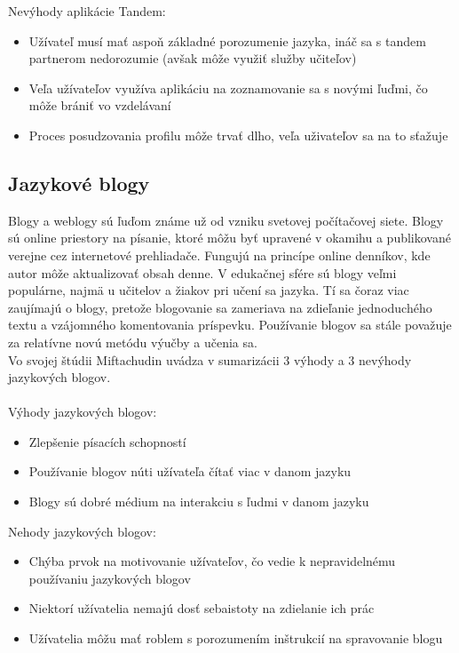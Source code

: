 \documentclass[10pt,oneside,slovak,a4paper]{article}
\begin{document}
Nevýhody aplikácie Tandem:
\begin{itemize}
\item Užívateľ musí mať aspoň základné porozumenie jazyka, ináč sa s tandem partnerom nedorozumie (avšak môže využiť služby učiteľov) \cite{tandem}
\item Veľa užívateľov využíva aplikáciu na zoznamovanie sa s novými ľuďmi, čo môže brániť vo vzdelávaní \cite{tandem}
\item Proces posudzovania profilu môže trvať dlho, veľa uživateľov sa na to sťažuje \cite{tandem}
\end{itemize}

\subsection{Jazykové blogy} %

Blogy a weblogy sú ľuďom známe už od vzniku svetovej počítačovej siete. Blogy sú online priestory na písanie, ktoré môžu byť upravené v okamihu a publikované verejne cez internetové prehliadače. Fungujú na princípe online denníkov, kde autor môže aktualizovať obsah denne. V edukačnej sfére sú blogy veľmi  populárne, najmä u učitelov a žiakov pri učení sa jazyka. Tí sa čoraz viac zaujímajú o blogy, pretože blogovanie sa zameriava na zdieľanie jednoduchého textu a vzájomného komentovania príspevku. Používanie blogov sa stále považuje za relatívne novú metódu výučby a učenia sa. \cite{blog-mif}\\
Vo svojej štúdii Miftachudin \cite{blog-mif} uvádza v sumarizácii 3 výhody a 3 nevýhody jazykových blogov.\\
\\
Výhody jazykových blogov:
\begin{itemize}
\item Zlepšenie písacích schopností \cite{blog-mif}
\item Používanie blogov núti užívateľa čítať viac v danom jazyku \cite{blog-mif}
\item Blogy sú dobré médium na interakciu s ľudmi v danom jazyku \cite{blog-mif}
\end{itemize}
Nehody jazykových blogov:
\begin{itemize}
\item Chýba prvok na motivovanie užívateľov, čo vedie k nepravidelnému používaniu jazykových blogov \cite{blog-mif}
\item Niektorí užívatelia nemajú dosť sebaistoty na zdielanie ich prác \cite{blog-mif}
\item Užívatelia môžu mať roblem s porozumením inštrukcií na spravovanie blogu \cite{blog-mif}
\end{itemize}
\end{document}
